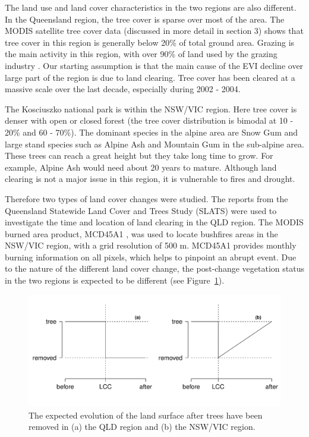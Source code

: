 \documentclass[draft,linenumbers]{agujournal}
\begin{document}
The land use and land cover characteristics in the two regions are also different. In the Queensland region, the tree cover is sparse over most of the area. The MODIS satellite tree cover data (discussed in more detail in section 3) shows that tree cover in this region is generally below 20\% of total ground area. Grazing is the main activity in this region, with over 90\% of land used by the grazing industry \citep{ABARES2010}. Our starting assumption is that the main cause of the EVI  decline over large part of the region is due to land clearing. Tree cover has been cleared at a massive scale over the last decade, especially during 2002 - 2004.  

The Kosciuszko national park is within the NSW/VIC region. Here tree cover is denser with open or closed forest (the tree cover distribution is bimodal at 10 - 20\% and 60 - 70\%). The dominant species in the alpine area are Snow Gum and large stand species such as Alpine Ash and Mountain Gum in the sub-alpine area. These trees can reach a great height but they take long time to grow. For example, Alpine Ash would need about 20 years to mature. Although land clearing is not a major issue in this region, it is vulnerable to fires and drought. 

Therefore two types of land cover changes were studied. The reports from the Queensland Statewide Land Cover and Trees Study (SLATS) \citep[e.g.][]{SLATS2001,SLATS2003} were used to investigate the time and location of land clearing in the QLD region. The MODIS burned area product, MCD45A1 \citep{Roy2002,Roy2005,Roy2008}, was used to locate bushfires areas in the NSW/VIC region, with a grid resolution of 500 m. MCD45A1 provides monthly burning information on all pixels, which helps to pinpoint an abrupt event. Due to the nature of the different land cover change, the post-change vegetation status in the two regions is expected to be different (see Figure~\ref{fig:tc_simple}). 

\begin{figure}[ht!]
  \centerline{\includegraphics[scale=0.65]{tc_simple.pdf}}
  \caption{The expected evolution of the land surface after trees have been removed in (a) the QLD region and (b) the NSW/VIC region.}
  \label{fig:tc_simple}
\end{figure}
\end{document}
